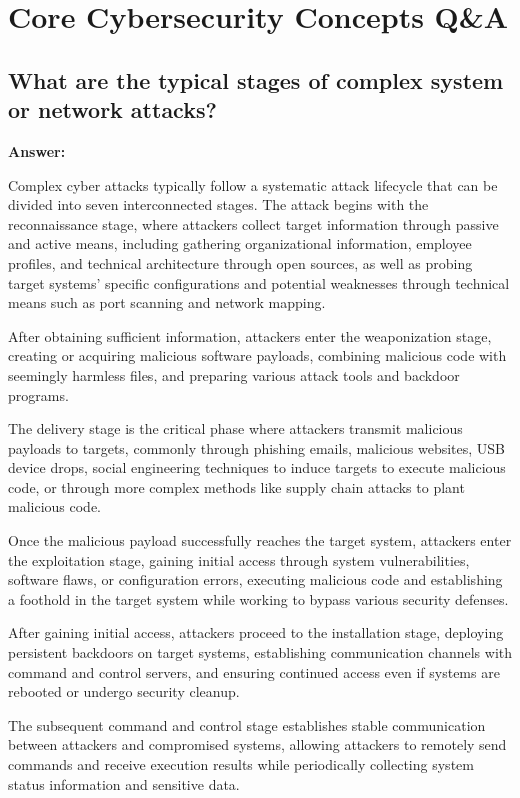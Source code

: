 \documentclass[12pt,a4paper]{article}
\begin{document}
\section{Core Cybersecurity Concepts Q\&A}

\subsection{What are the typical stages of complex system or network attacks?}

\textbf{Answer:}

Complex cyber attacks typically follow a systematic attack lifecycle that can be divided into seven interconnected stages. The attack begins with the reconnaissance stage, where attackers collect target information through passive and active means, including gathering organizational information, employee profiles, and technical architecture through open sources, as well as probing target systems' specific configurations and potential weaknesses through technical means such as port scanning and network mapping.

After obtaining sufficient information, attackers enter the weaponization stage, creating or acquiring malicious software payloads, combining malicious code with seemingly harmless files, and preparing various attack tools and backdoor programs.

The delivery stage is the critical phase where attackers transmit malicious payloads to targets, commonly through phishing emails, malicious websites, USB device drops, social engineering techniques to induce targets to execute malicious code, or through more complex methods like supply chain attacks to plant malicious code.

Once the malicious payload successfully reaches the target system, attackers enter the exploitation stage, gaining initial access through system vulnerabilities, software flaws, or configuration errors, executing malicious code and establishing a foothold in the target system while working to bypass various security defenses.

After gaining initial access, attackers proceed to the installation stage, deploying persistent backdoors on target systems, establishing communication channels with command and control servers, and ensuring continued access even if systems are rebooted or undergo security cleanup.

The subsequent command and control stage establishes stable communication between attackers and compromised systems, allowing attackers to remotely send commands and receive execution results while periodically collecting system status information and sensitive data.
\end{document}
